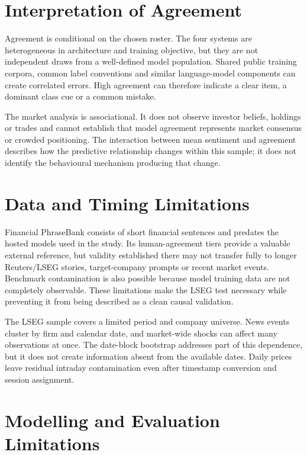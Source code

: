 \documentclass[11pt,a4paper,oneside]{book}
\begin{document}
\section{Interpretation of Agreement}
\label{sec:discussion-interpretation}

Agreement is conditional on the chosen roster.
The four systems are heterogeneous in architecture and training objective, but they are not independent draws from a well-defined model population.
Shared public training corpora, common label conventions and similar language-model components can create correlated errors.
High agreement can therefore indicate a clear item, a dominant class cue or a common mistake.

The market analysis is associational.
It does not observe investor beliefs, holdings or trades and cannot establish that model agreement represents market consensus or crowded positioning.
The interaction between mean sentiment and agreement describes how the predictive relationship changes within this sample; it does not identify the behavioural mechanism producing that change.

\section{Data and Timing Limitations}
\label{sec:discussion-data}

Financial PhraseBank consists of short financial sentences and predates the hosted models used in the study.
Its human-agreement tiers provide a valuable external reference, but validity established there may not transfer fully to longer Reuters/LSEG stories, target-company prompts or recent market events.
Benchmark contamination is also possible because model training data are not completely observable.
These limitations make the LSEG test necessary while preventing it from being described as a clean causal validation.

The LSEG sample covers a limited period and company universe.
News events cluster by firm and calendar date, and market-wide shocks can affect many observations at once.
The date-block bootstrap addresses part of this dependence, but it does not create information absent from the available dates.
Daily prices leave residual intraday contamination even after timestamp conversion and session assignment.

\section{Modelling and Evaluation Limitations}
\label{sec:discussion-models}
\end{document}
